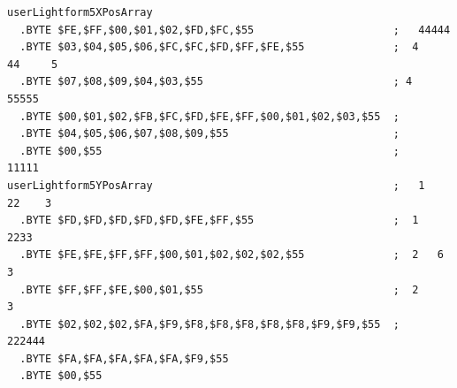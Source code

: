 \begin{minipage}[b]{0.68\linewidth}
\begin{lrbox}{\mybox}%
\begin{lstlisting}[basicstyle=\ttfamily\tiny,escapechar=\%]
userLightform5XPosArray
  .BYTE $FE,$FF,$00,$01,$02,$FD,$FC,$55                      ;   44444        
  .BYTE $03,$04,$05,$06,$FC,$FC,$FD,$FF,$FE,$55              ;  4     44     5
  .BYTE $07,$08,$09,$04,$03,$55                              ; 4        55555 
  .BYTE $00,$01,$02,$FB,$FC,$FD,$FE,$FF,$00,$01,$02,$03,$55  ;                
  .BYTE $04,$05,$06,$07,$08,$09,$55                          ;                
  .BYTE $00,$55                                              ;    11111       
userLightform5YPosArray                                      ;   1     22    3
  .BYTE $FD,$FD,$FD,$FD,$FD,$FE,$FF,$55                      ;  1        2233 
  .BYTE $FE,$FE,$FF,$FF,$00,$01,$02,$02,$02,$55              ;  2   6   3     
  .BYTE $FF,$FF,$FE,$00,$01,$55                              ;  2      3      
  .BYTE $02,$02,$02,$FA,$F9,$F8,$F8,$F8,$F8,$F8,$F9,$F9,$55  ;   222444       
  .BYTE $FA,$FA,$FA,$FA,$FA,$F9,$55
  .BYTE $00,$55
\end{lstlisting}
\end{lrbox}%
\scalebox{0.8}{\usebox{\mybox}}

\end{minipage}
%
%

